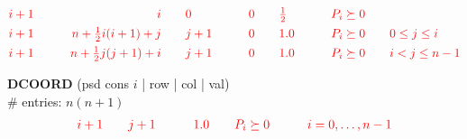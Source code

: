\documentclass[11pt,a4paper]{article}
\theoremstyle{definition}
\begin{document}
{\[\begin{aligned}
    &{\color{red}i+1} \qquad &{\color{red}i} \qquad &{\color{red}0} \qquad
    &{\color{red}0} \qquad &{\color{red}\tfrac{1}{2}} \qquad
    &{\color{red}P_i \succeq 0} \qquad &\\
    &{\color{red}i+1} \qquad &{\color{red}n+\tfrac{1}{2}i(i+1)+j} \qquad &{\color{red}j+1} \qquad
    &{\color{red}0} \qquad &{\color{red}1.0} \qquad
    &{\color{red}P_i \succeq 0} \qquad &{\color{red}0 \leq j \leq i}\\ 
    &{\color{red}i+1} \qquad &{\color{red}n+\tfrac{1}{2}j(j+1)+i} \qquad &{\color{red}j+1} \qquad
    &{\color{red}0} \qquad &{\color{red}1.0} \qquad
    &{\color{red}P_i \succeq 0} \qquad &{\color{red}i < j \leq
      n-1 }
  \end{aligned}
\]
{\color{red}\textbf{DCOORD} (psd cons $i$ | row | col | val) \\
  \# entries: $n(n+1)$\\
  \[
    \begin{aligned}
      {\color{red} i+1} \qquad & {\color{red} j+1} \qquad & {\color{red}
        1.0} \qquad & {\color{red} P_i \succeq 0} \qquad & {\color{red} i =
        0, \dots, n-1}
    \end{aligned}
    \]

  }
}
\end{document}
